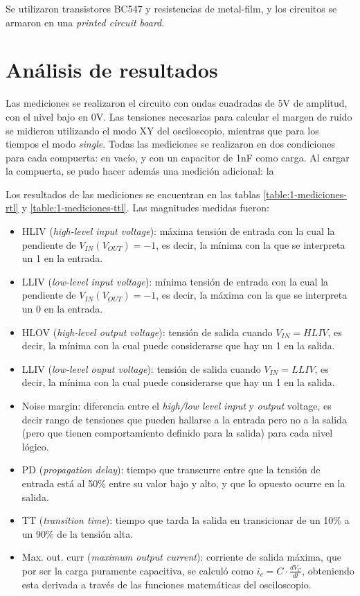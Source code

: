 \documentclass[../../e3_tp2_main.tex]{subfiles}
\begin{document}
Se utilizaron transistores BC547 y resistencias de metal-film, y los circuitos se armaron en una \textit{printed circuit board}. \par

\section{An\'alisis de resultados}

Las mediciones se realizaron el circuito con ondas cuadradas de 5V de amplitud, con el nivel bajo en 0V. Las tensiones necesarias para calcular el margen de ruido se midieron utilizando el modo XY del osciloscopio, mientras que para los tiempos el modo \textit{single}. Todas las mediciones se realizaron en dos condiciones para cada compuerta: en vac\'io, y con un capacitor de 1nF como carga. Al cargar la compuerta, se pudo hacer adem\'as una medici\'on adicional: la 

Los resultados de las mediciones se encuentran en las tablas \ref{table:1-mediciones-rtl} y \ref{table:1-mediciones-ttl}. Las magnitudes medidas fueron:

\begin{itemize}
	\item HLIV (\textit{high-level input voltage}): m\'axima tensi\'on de entrada con la cual la pendiente de $V_{IN}(V_{OUT})=-1$, es decir, la m\'inima con la que se interpreta un 1 en la entrada.
	\item LLIV (\textit{low-level input voltage}): m\'inima tensi\'on de entrada con la cual la pendiente de $V_{IN}(V_{OUT})=-1$, es decir, la m\'axima con la que se interpreta un 0 en la entrada.
	\item HLOV (\textit{high-level output voltage}): tensi\'on de salida cuando $V_{IN}=HLIV$, es decir, la m\'inima con la cual puede considerarse que hay un 1 en la salida.
	\item LLIV (\textit{low-level ouput voltage}): tensi\'on de salida cuando $V_{IN}=LLIV$, es decir, la m\'inima con la cual puede considerarse que hay un 1 en la salida.
	\item Noise margin: diferencia entre el \textit{high/low level input} y \textit{output} voltage, es decir rango de tensiones que pueden hallarse a la entrada pero no a la salida (pero que tienen comportamiento definido para la salida) para cada nivel l\'ogico. 
	\item PD (\textit{propagation delay}): tiempo que transcurre entre que la tensi\'on de entrada est\'a al 50\% entre su valor bajo y alto, y que lo opuesto ocurre en la salida.
	\item TT (\textit{transition time}): tiempo que tarda la salida en transicionar de un 10\% a un 90\% de la tensi\'on alta.
	\item Max. out. curr (\textit{maximum output current}): corriente de salida m\'axima, que por ser la carga puramente capacitiva, se calcul\'o como $i_c = C \cdot \frac{dV_C}{dt}$, obteniendo esta derivada a trav\'es de las funciones matem\'aticas del osciloscopio. \par
\end{itemize}
\end{document}
